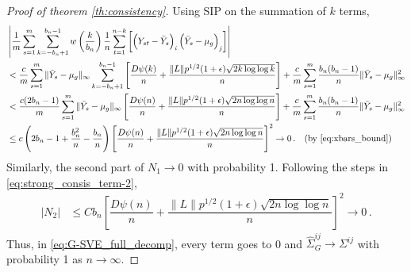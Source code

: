 \documentclass[11pt]{article}
\theoremstyle{remark}
\begin{document}
\begin{proof}[Proof of theorem \ref{th:consistency}]
Using SIP on the summation of $k$ terms,
\begin{align*}
    & \left|\dfrac{1}{m}\sum_{s=1}^{m}\sum_{k=-b_n+1}^{b_n-1}w\left(\dfrac{k}{b_n}\right)\dfrac{1}{n}\sum_{t=1}^{n-k}\left[ \left(Y_{st} - \bar{Y}_s \right)_i  \left(\bar{Y}_s - \mu_g \right)_j \right] \right|\\
   &  < \dfrac{c}{m}\sum\limits_{s=1}^{m}\|\bar{Y}_s - \mu_g\|_{\infty}\sum\limits_{k=-b_n + 1}^{b_n-1}\left[ \dfrac{D \psi(k)}{n} + \dfrac{\|L\| p^{1/2}(1+\epsilon)\sqrt{2k \log\log k}}{n}  \right] + \dfrac{c}{m}\sum\limits_{s=1}^{m} \dfrac{b_n(b_n-1)}{n}\|\bar{Y}_s - \mu_g\|_{\infty}^2\\
   &  < \dfrac{c(2b_n-1)}{m}\sum\limits_{s=1}^{m}\|\bar{Y}_s - \mu_g\|_{\infty}\left[ \dfrac{D \psi(n)}{n} + \dfrac{\|L\| p^{1/2}(1+\epsilon)\sqrt{2n \log\log n}}{n}  \right] + \dfrac{c}{m}\sum\limits_{s=1}^{m} \dfrac{b_n(b_n-1)}{n}\|\bar{Y}_s - \mu_g\|_{\infty}^2 \\
   &  \leq   c\left(2b_n - 1 + \dfrac{b_n^2}{n} - \dfrac{b_n}{n}\right)\left[ \dfrac{D \psi(n)}{n} + \dfrac{\|L\| p^{1/2}(1+\epsilon)\sqrt{2n \log\log n}}{n}  \right]^2  \to 0\,. \quad  \text{(by \eqref{eq:xbars_bound})}
\end{align*}
%
% 
%
%
Similarly, the second part of $N_1 \to 0$ with probability 1. 
%
Following the steps in \eqref{eq:strong_consis_term-2}, 
\begin{align*}
    |N_2| & \leq Cb_n\left[ \dfrac{D \psi(n)}{n} + \dfrac{\|L\| p^{1/2}(1+\epsilon)\sqrt{2n \log\log n}}{n}  \right]^2  \to 0\,.
\end{align*}
Thus, in \eqref{eq:G-SVE_full_decomp}, every term goes to 0 and $\hat{\Sigma}_{G}^{ij} \to \Sigma^{ij}$ with probability 1 as $n \to \infty$. 
\end{proof}
\end{document}
